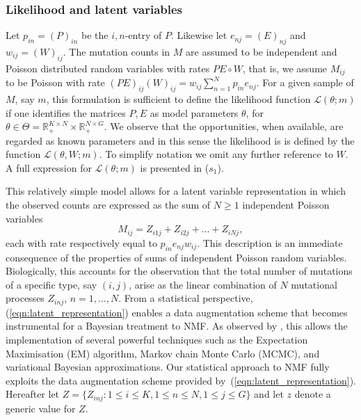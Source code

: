 \documentclass{bioinfo}
\begin{document}
\subsubsection{Likelihood and latent variables}
Let $p_{in} = (P)_{in}$ be the $i,n$-entry of $P$. Likewise let
$e_{nj} = (E)_{nj}$ and $w_{ij} = (W)_{ij}$.  The mutation counts in
$M$ are assumed to be independent and Poisson distributed random
variables with rates $PE\circ W$, that is, we assume $M_{ij}$ to be
Poisson with rate $(PE)_{ij}(W)_{ij} = w_{ij}\sum_{n=1}^N
p_{in}e_{nj}$. For a given sample of $M$, say $m$, this formulation is
sufficient to define the likelihood function $\mathcal L(\theta; m)$
if one identifies the matrices $P, E$ as model parameters $\theta$,
for $\theta \in \Theta = \mathbb R_+^{K\times N}\times \mathbb
R_+^{N\times G}$. We observe that the opportunities, when available,
are regarded as known parameters and in this sense the likelihood is
is  defined by the function $\mathcal L(\theta, W; m)$. To simplify 
notation we omit any further reference to $W$. A full expression
for $\mathcal L(\theta; m)$ is presented in ($s_1$).


This relatively simple model allows for a latent variable
representation in which the observed counts are expressed as the sum
of $N\geqslant 1$ independent Poisson variables
\begin{equation}
  \label{eqn:latent_representation}
   M_{ij} = Z_{i1j} + Z_{i2j} + \ldots + Z_{iNj},
\end{equation} 
each with rate respectively equal to $p_{in}e_{nj}w_{ij}$. This
description is an immediate consequence of the properties of sums of
independent Poisson random variables. Biologically, this accounts for
the observation that the total number of mutations of a specific type,
say $(i,j)$, arise as the linear combination of $N$ mutational
processes $Z_{inj}$, $n = 1, \ldots, N$. From a statistical
perspective, (\ref{eqn:latent_representation}) enables a data
augmentation scheme that becomes instrumental for a Bayesian treatment
to NMF. As observed by \cite{C}, this allows the implementation of
several powerful techniques such as the Expectation Maximisation (EM)
algorithm, Markov chain Monte Carlo (MCMC), and variational Bayesian
approximations.  Our statistical approach to NMF fully exploits the
data augmentation scheme provided
by~(\ref{eqn:latent_representation}).  Hereafter let $Z = \{Z_{inj}:
1\leqslant i\leqslant K, 1\leqslant n \leqslant N, 1\leqslant
j\leqslant G\}$ and let $z$ denote a generic value for $Z$.
\end{document}
